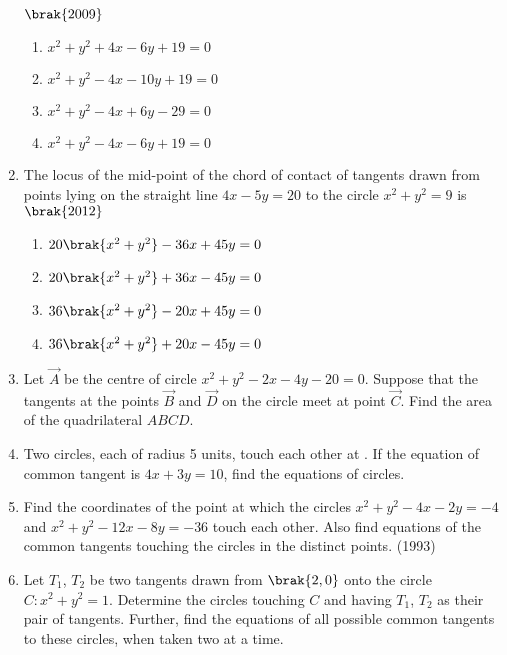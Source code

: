 \begin{enumerate}
             \hfill$\brak{2009}$
\begin{multicols}{2}
\begin{enumerate}
             \item $x^2+y^2+4x-6y+19=0$
             \item $x^2+y^2-4x-10y+19=0$
             \item $x^2+y^2-4x+6y-29=0$
             \item $x^2+y^2-4x-6y+19=0$
             \end{enumerate}
\end{multicols}
             \item The locus of the mid-point of the chord of contact of tangents drawn from points lying on the straight line $4x-5y=20$ to the circle $x^2+y^2=9$ is
                 \hfill$\brak{2012}$
\begin{multicols}{2}
\begin{enumerate}
                 \item $20\brak{x^2+y^2}-36x+45y=0$
                 \item $20\brak{x^2+y^2}+36x-45y=0$
                 \item $36\brak{x^2+y^2}-20x+45y=0$
                 \item $36\brak{x^2+y^2}+20x-45y=0$
             \end{enumerate}
             \end{multicols}
\item Let $\vec{A}$ be the centre of circle $x^2+y^2-2x-4y-20=0$. Suppose that the tangents at the points $\vec{B}$ and $\vec{D}$ on the circle meet at point $\vec{C}$. Find the area of the quadrilateral $ABCD$.
%
\hfill {}
\item Two circles,  each of radius 5 units,  touch each other at . If the equation of common tangent is $4x+3y=10$,  find the equations of circles.
%
\hfill {}
\item Find the coordinates of the point at which the circles $x^2+y^2-4x-2y=-4$ and $x^2+y^2-12x-8y=-36$ touch each other. Also find equations of the common tangents touching the circles in the distinct points.                        
%
\hfill(1993)
%
\item Let $T_{1}$,  $T_{2}$ be two tangents drawn from $\brak{2, 0}$ onto the circle $C :x^2+y^2=1$. Determine the circles touching $C$ and having $T_{1}$,  $T_{2}$ as their pair of tangents. Further,  find the equations of all possible common tangents to these circles,  when taken two at a time.


\end{enumerate}

